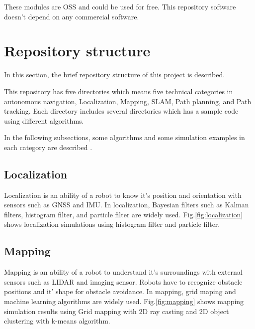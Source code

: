 \documentclass{bmvc2k}
\begin{document}
These modules are OSS and could be used for free.
This repository software doesn't depend on any commercial software.


\section{Repository structure}

In this section, the brief repository structure of this project is described.

This repository has five directories which means five technical categories in autonomous navigation, Localization, Mapping, SLAM, Path planning, and Path tracking.
Each directory includes several directories which has a sample code using different algorithms.

In the following subsections, some algorithms and some simulation examples in each category are described .

\subsection{Localization}

Localization is an ability of a robot to know it's position and orientation with sensors such as GNSS and IMU.
In localization, Bayesian filters such as Kalman filters, histogram filter, and particle filter are widely used\cite{PR}.
Fig.\ref{fig:localization} shows localization simulations using histogram filter and particle filter.



\subsection{Mapping}
Mapping is an ability of a robot to understand it's surroundings with external sensors such as LIDAR and imaging sensor.
Robots have to recognize obstacle positions and it' shape for obstacle avoidance.
In mapping, grid maping and machine learning algorithms are widely used\cite{PR}\cite{PRML}.
Fig.\ref{fig:mapping} shows mapping simulation results using Grid mapping with 2D ray casting and 2D object clustering with k-means algorithm.
\end{document}
